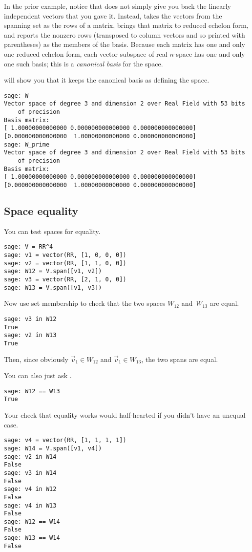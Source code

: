 In the prior example, notice that \Sage{} does not simply
give you back the linearly independent
vectors that you gave it.
Instead, \Sage{} takes the vectors from the spanning set 
as the rows of a matrix,
brings that matrix to reduced echelon form, and reports the nonzero 
rows (transposed to column vectors and so printed with parentheses) 
as the members of the basis.
Because each matrix has one and only one reduced echelon form, each 
vector subspace of real $n$-space has one and only one such
basis;
this is a \textit{canonical basis} for the space.

\Sage{} will show you that it keeps the canonical basis as defining the
space. 
\begin{lstlisting}
sage: W
Vector space of degree 3 and dimension 2 over Real Field with 53 bits 
    of precision
Basis matrix:
[ 1.00000000000000 0.000000000000000 0.000000000000000]
[0.000000000000000  1.00000000000000 0.000000000000000]
sage: W_prime
Vector space of degree 3 and dimension 2 over Real Field with 53 bits 
    of precision
Basis matrix:
[ 1.00000000000000 0.000000000000000 0.000000000000000]
[0.000000000000000  1.00000000000000 0.000000000000000]  
\end{lstlisting}



\subsection{Space equality}

You can test spaces for equality.
\begin{lstlisting}
sage: V = RR^4
sage: v1 = vector(RR, [1, 0, 0, 0])
sage: v2 = vector(RR, [1, 1, 0, 0])
sage: W12 = V.span([v1, v2])
sage: v3 = vector(RR, [2, 1, 0, 0])
sage: W13 = V.span([v1, v3])  
\end{lstlisting}
Now use set membership to check that the two spaces $W_{12}$ and~$W_{13}$
are equal.
\begin{lstlisting}
sage: v3 in W12
True
sage: v2 in W13
True  
\end{lstlisting}
Then, since obviously $\vec{v}_1\in W_{12}$ and $\vec{v}_1\in W_{13}$, the two
spans are equal.

You can also just ask \Sage{}.
\begin{lstlisting}
sage: W12 == W13
True 
\end{lstlisting}

Your check that equality works would half-hearted if you didn't have 
an unequal case.
\begin{lstlisting}
sage: v4 = vector(RR, [1, 1, 1, 1])
sage: W14 = V.span([v1, v4])
sage: v2 in W14
False
sage: v3 in W14                                 
False
sage: v4 in W12
False
sage: v4 in W13
False
sage: W12 == W14                                                              
False
sage: W13 == W14
False 
\end{lstlisting}

